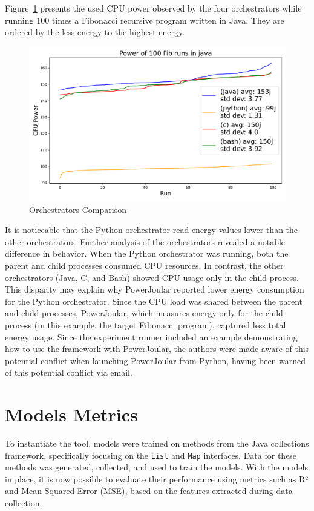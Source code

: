 Figure~\ref{fig:4_orchs_comparison} presents the used CPU power observed by the four orchestrators while running 
100 times a Fibonacci recursive program written in Java. They are ordered by the less energy to the highest energy. 

\begin{figure}[htbp]
  \centering
  \includegraphics[width = .8 \textwidth]{figures/4_orchs_comparison.pdf}
  \caption{Orchestrators Comparison}
  \label{fig:4_orchs_comparison}
\end{figure}

It is noticeable that the Python orchestrator read energy values lower than the other orchestrators. Further analysis of the orchestrators revealed a notable difference in behavior. When the Python orchestrator was running, both the parent and child processes consumed CPU resources. In contrast, the other orchestrators (Java, C, and Bash) showed CPU usage only in the child process. This disparity may explain why PowerJoular reported lower energy consumption for the Python orchestrator. Since the CPU load was shared between the parent and child processes, PowerJoular, which measures energy only for the child process (in this example, the target Fibonacci program), captured less total energy usage.
Since the experiment runner included an example demonstrating how to use the framework with PowerJoular, the authors were made aware of this potential conflict when launching PowerJoular from Python, {\color{blue}having been warned of this potential conflict via email}.


\section{Models Metrics} \label{sec:models_metrics}

To instantiate the tool, models were trained on methods from the Java collections framework, specifically focusing on the \texttt{List} and \texttt{Map} interfaces. Data for these methods was generated, collected, and used to train the models. With the models in place, it is now possible to evaluate their performance using metrics such as R² and Mean Squared Error (MSE), based on the features extracted during data collection.

